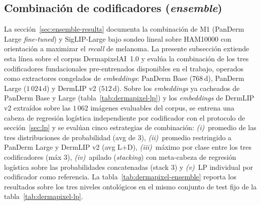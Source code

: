 \subsection*{Combinación de codificadores (\emph{ensemble})}
\label{sec:dermapixel-ensemble}

La secci\'on~\ref{sec:ensemble-results} documenta la combinación
de M1 (PanDerm Large \emph{fine-tuned}) y SigLIP-Large bajo sondeo
lineal sobre HAM10000 con orientación a maximizar el \emph{recall}
de melanoma. La presente subsección extiende esta línea sobre el
corpus DermapixelAI~1.0 y evalúa la combinación de los tres
codificadores fundacionales pre-entrenados disponibles en el
trabajo, operados como extractores congelados de
\emph{embeddings}: PanDerm Base ($768$\,d), PanDerm Large
($1\,024$\,d) y DermLIP v2 ($512$\,d). Sobre los
\emph{embeddings} ya cacheados de PanDerm Base y Large
(tabla~\ref{tab:dermapixel-lp}) y los \emph{embeddings} de
DermLIP v2 extraídos sobre las $1\,062$ imágenes evaluables del
corpus, se entrena una cabeza de regresión logística
independiente por codificador con el protocolo de
secci\'on~\ref{sec:lp} y se evalúan cinco estrategias de
combinación: \emph{(i)}~promedio de las tres distribuciones de
probabilidad (avg de 3), \emph{(ii)}~promedio restringido a
PanDerm Large y DermLIP v2 (avg L$+$D), \emph{(iii)}~máximo por
clase entre los tres codificadores (máx 3), \emph{(iv)}~apilado
(\emph{stacking}) con meta-cabeza de regresión logística sobre
las probabilidades concatenadas (stack 3) y \emph{(v)}~LP
individual por codificador como referencia. La
tabla~\ref{tab:dermapixel-ensemble} reporta los resultados sobre
los tres niveles ontológicos en el mismo conjunto de test fijo de
la tabla~\ref{tab:dermapixel-lp}.

